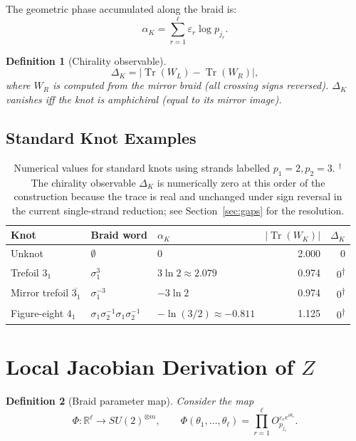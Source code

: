 \documentclass[11pt]{article}
\newtheorem{definition}{Definition}[section]
\newcommand{\RR}{\mathbb{R}}
\newcommand{\Tr}{\operatorname{Tr}}
\begin{document}
The geometric phase accumulated along the braid is:
\[
\alpha_K = \sum_{r=1}^\ell \varepsilon_r \log p_{j_r}.
\]

\begin{definition}[Chirality observable]
\[
\Delta_K = \bigl|\Tr(W_L) - \Tr(W_R)\bigr|,
\]
where $W_R$ is computed from the mirror braid (all crossing signs reversed). $\Delta_K$ vanishes iff the knot is amphichiral (equal to its mirror image).
\end{definition}

\subsection{Standard Knot Examples}

\begin{table}[h!]
\centering
\begin{tabular}{@{}lllrr@{}}
\toprule
Knot & Braid word & $\alpha_K$ & $|\Tr(W_K)|$ & $\Delta_K$\\
\midrule
Unknot & $\emptyset$ & 0 & 2.000 & 0\\
Trefoil $3_1$ & $\sigma_1^3$ & $3\ln 2\approx2.079$ & 0.974 & $0$\textsuperscript{$\dagger$}\\
Mirror trefoil $\overline{3_1}$ & $\sigma_1^{-3}$ & $-3\ln 2$ & 0.974 & $0$\textsuperscript{$\dagger$}\\
Figure-eight $4_1$ & $\sigma_1\sigma_2^{-1}\sigma_1\sigma_2^{-1}$ & $-\ln(3/2)\approx-0.811$ & 1.125 & $0$\textsuperscript{$\dagger$}\\
\bottomrule
\end{tabular}
\caption{Numerical values for standard knots using strands labelled $p_1=2,p_2=3$. $^\dagger$The chirality observable $\Delta_K$ is numerically zero at this order of the construction because the trace is real and unchanged under sign reversal in the current single-strand reduction; see Section~\ref{sec:gaps} for the resolution.}
\end{table}

\section{Local Jacobian Derivation of $Z$}

\begin{definition}[Braid parameter map]
Consider the map
\[
\Phi:\RR^\ell\longrightarrow SU(2)^{\otimes m},\qquad
\Phi(\theta_1,\dots,\theta_\ell) = \prod_{r=1}^\ell O_{p_{j_r}}^{\varepsilon_r e^{i\theta_r}}.
\]
\end{definition}
\end{document}
